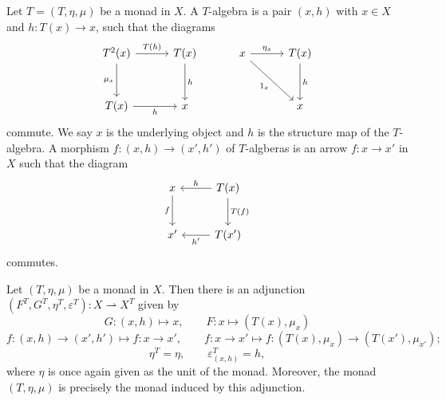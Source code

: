 \begin{definition}[$T$-Algebra]\label{dfn:6.2}
	Let $T=(T,\eta,\mu)$ be a monad in $X$. A $T$-algebra is a pair $(x,h)$ with $x\in X$ and $h : T(x) \to x$, such that the diagrams
	\[\begin{tikzcd}[row sep = 3em, column sep = 3em]
	T^2(x)\ar[" T(h) ", r] \ar[" \mu_x "', d]  & T(x)\ar[" h ", d]  & x\ar[" \eta_x ", r] \ar[" 1_x "', dr]  & T(x)\ar[" h ", d]  \\
	T(x)\ar[" h "', r]  & x &  & x
	\end{tikzcd}\]
	commute. We say $x$ is the underlying object and $h$ is the structure map of the $T$-algebra. A morphism $f : (x,h) \to (x',h')$ of $T$-algberas is an arrow $f : x \to x'$ in $X$ such that the diagram
	\[\begin{tikzcd}[row sep = 2.5em, column sep = 2.5em]
	x\ar[" f "', d]  & T(x)\ar[" h "', l] \ar[" T(f) ", d]  \\
	x' & T(x')\ar[" h' ", l] 
	\end{tikzcd}\]
	commutes.
\end{definition}
\begin{theorem}\label{thm:6.1}
	Let $(T,\eta,\mu)$ be a monad in $X$. Then there is an adjunction $(F^T,G^T,\eta^T,\varepsilon ^T): X\rightharpoonup X^T$ given by
	\[
		G : (x,h)\mapsto x,\qquad F : x\mapsto (T(x),\mu_x)
	\]
	\[
		f : (x,h) \to (x',h')\mapsto f : x \to x',\qquad f : x\to x' \mapsto f : (T(x),\mu_x) \to (T(x'),\mu_{x'} )
	;\]
	\[
		\eta^T=\eta,\qquad \varepsilon ^T_{(x,h)} =h,
	\]
	where $\eta$ is once again given as the unit of the monad. Moreover, the monad $(T,\eta,\mu)$ is precisely the monad induced by this adjunction.
\end{theorem}

